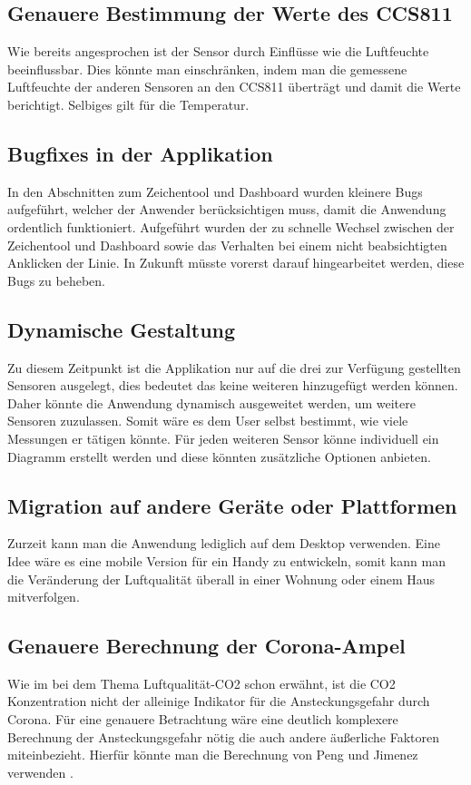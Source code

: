 \documentclass[]{article}
\begin{document}
		
		\subsection{Genauere Bestimmung der Werte des CCS811}
			Wie bereits angesprochen ist der Sensor durch Einflüsse wie die Luftfeuchte beeinflussbar. Dies könnte man einschränken, indem man die gemessene Luftfeuchte der anderen Sensoren an den CCS811 überträgt und damit die Werte berichtigt. Selbiges gilt für die Temperatur. 
		
		\subsection{Bugfixes in der Applikation}
			In den Abschnitten zum Zeichentool und Dashboard wurden kleinere Bugs aufgeführt, welcher der Anwender berücksichtigen muss, damit die Anwendung ordentlich funktioniert. Aufgeführt wurden der zu schnelle Wechsel zwischen der Zeichentool und Dashboard sowie das Verhalten bei einem nicht beabsichtigten Anklicken der Linie. In Zukunft müsste vorerst darauf hingearbeitet werden, diese Bugs zu beheben. 
			
		\subsection{Dynamische Gestaltung}
			Zu diesem Zeitpunkt ist die Applikation nur auf die drei zur Verfügung gestellten Sensoren ausgelegt, dies bedeutet das keine weiteren hinzugefügt werden können. Daher könnte die Anwendung dynamisch ausgeweitet werden, um weitere Sensoren zuzulassen. Somit wäre es dem User selbst bestimmt, wie viele Messungen er tätigen könnte. Für jeden weiteren Sensor könne individuell ein Diagramm erstellt werden und diese könnten zusätzliche Optionen anbieten. 
					
		\subsection{Migration auf andere Geräte oder Plattformen}
			Zurzeit kann man die Anwendung lediglich auf dem Desktop verwenden. Eine Idee wäre es eine mobile Version für ein Handy zu entwickeln, somit kann man die Veränderung der Luftqualität überall in einer Wohnung oder einem Haus mitverfolgen. 
		\subsection{Genauere Berechnung der Corona-Ampel}
			Wie im bei dem Thema Luftqualität-CO2 schon erwähnt, ist die CO2 Konzentration nicht der alleinige Indikator für die Ansteckungsgefahr durch Corona. Für eine genauere Betrachtung wäre eine deutlich komplexere Berechnung der Ansteckungsgefahr nötig die auch andere äußerliche Faktoren miteinbezieht. Hierfür könnte man die Berechnung von Peng und Jimenez verwenden \cite{luftquali_co2_corona}.
\end{document}
